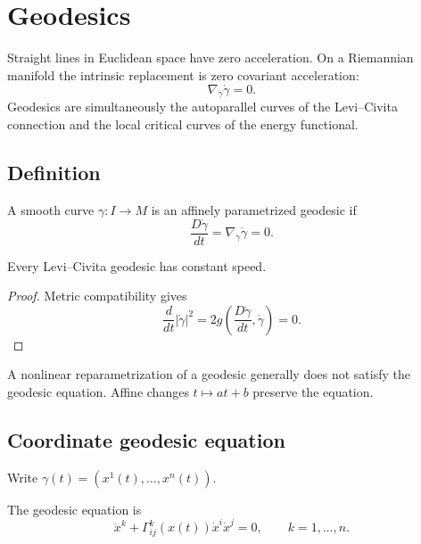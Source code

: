 \chapter{Geodesics}
\label{ch:vii23-geodesics}

Straight lines in Euclidean space have zero acceleration.  On a Riemannian
manifold the intrinsic replacement is zero covariant acceleration:
\[
\boxed{\nabla_{\dot\gamma}\dot\gamma=0.}
\]
Geodesics are simultaneously the autoparallel curves of the Levi--Civita
connection and the local critical curves of the energy functional.

\section{Definition}

\begin{definition}[Geodesic]\label{def:vii23-geodesic}
A smooth curve \(\gamma:I\to M\) is an affinely parametrized geodesic if
\[
\frac{D\dot\gamma}{dt}
=
\nabla_{\dot\gamma}\dot\gamma
=
0.
\]
\end{definition}

\begin{proposition}\label{prop:vii23-constant-speed}
Every Levi--Civita geodesic has constant speed.
\end{proposition}

\begin{proof}
Metric compatibility gives
\[
\frac{d}{dt}|\dot\gamma|^2
=
2g\!\left(\frac{D\dot\gamma}{dt},\dot\gamma\right)=0.
\]
\end{proof}

\begin{warning}\label{warn:vii23-affine-parameter}
A nonlinear reparametrization of a geodesic generally does not satisfy the
geodesic equation.  Affine changes \(t\mapsto at+b\) preserve the equation.
\end{warning}

\section{Coordinate geodesic equation}

Write \(\gamma(t)=(x^1(t),\dots,x^n(t))\).

\begin{theorem}\label{thm:vii23-ode}
The geodesic equation is
\[
\ddot x^k
+
\Gamma^k_{ij}(x(t))\dot x^i\dot x^j
=
0,
\qquad
k=1,\dots,n.
\]
\end{theorem}

